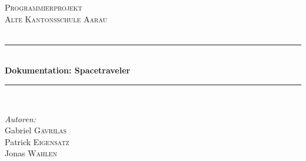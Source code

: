 %
%
%
% 

\begin{titlepage}

\newcommand{\HRule}{\rule{\linewidth}{0.5mm}} %

\center %
 

\textsc{\LARGE Programmierprojekt}\\[1.5cm] %
\textsc{\Large Alte Kantonsschule Aarau}\\[0.5cm] %
\textsc{\large}\\[0.5cm] %


\HRule \\[0.4cm]
{ \huge \bfseries Dokumentation: Spacetraveler}\\[0.4cm] %
\HRule \\[1.5cm]
 

\begin{minipage}{0.4\textwidth}
\begin{flushleft} \large
\emph{Autoren:}\\
Gabriel \textsc{Gavrilas}\\ %
Patrick \textsc{Eigensatz}\\ %
Jonas \textsc{Wahlen}\\ %
\end{flushleft}
\end{minipage}
~
\begin{minipage}{0.4\textwidth}
\begin{flushright} \large
\end{flushright}
\end{minipage}\\[2cm]


\end{titlepage}
